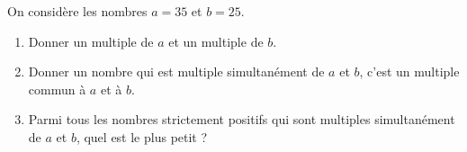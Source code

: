 \begin{exo}{}
	On considère les nombres $a = 35$ et $b = 25$.
	\begin{enumerate}
		\item Donner un multiple de $a$ et un multiple de $b$.
		\item Donner un nombre qui est multiple simultanément de $a$ et $b$, c'est un multiple commun à $a$ et à $b$.
		\item Parmi tous les nombres strictement positifs qui sont multiples simultanément de $a$ et $b$, quel est le plus petit ?
	\end{enumerate}
\end{exo}
